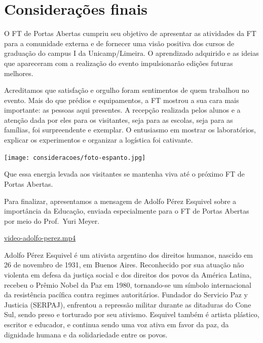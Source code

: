 \documentclass[
  letterpaper,
  DIV=11,
  numbers=noendperiod]{scrreprt}
\begin{document}

\chapter{Considerações finais}\label{considerauxe7uxf5es-finais}

O FT de Portas Abertas cumpriu seu objetivo de apresentar as atividades
da FT para a comunidade externa e de fornecer uma visão positiva dos
cursos de graduação do campus I da Unicamp/Limeira. O aprendizado
adquirido e as ideias que apareceram com a realização do evento
impulsionarão edições futuras melhores.

Acreditamos que satisfação e orgulho foram sentimentos de quem trabalhou
no evento. Mais do que prédios e equipamentos, a FT mostrou a sua cara
mais importante: as pessoas aqui presentes. A recepção realizada pelos
alunos e a atenção dada por eles para os visitantes, seja para as
escolas, seja para as famílias, foi surpreendente e exemplar. O
entusiasmo em mostrar os laboratórios, explicar os experimentos e
organizar a logística foi cativante.

\texttt{[image: consideracoes/foto-espanto.jpg]}

Que essa energia levada aos visitantes se mantenha viva até o próximo FT
de Portas Abertas.

Para finalizar, apresentamos a mensagem de Adolfo Pérez Esquivel sobre a
importância da Educação, enviada especialmente para o FT de Portas
Abertas por meio do Prof.~Yuri Meyer.

\url{video-adolfo-perez.mp4}

\begin{tcolorbox}[enhanced jigsaw, bottomrule=.15mm, left=2mm, colback=white, coltitle=black, colbacktitle=quarto-callout-caution-color!10!white, rightrule=.15mm, colframe=quarto-callout-caution-color-frame, leftrule=.75mm, breakable, arc=.35mm, opacityback=0, titlerule=0mm, bottomtitle=1mm, toptitle=1mm, opacitybacktitle=0.6, title=\textcolor{quarto-callout-caution-color}{\faFire}\hspace{0.5em}{Adolfo Pérez Esquivel}, toprule=.15mm]

Adolfo Pérez Esquivel é um ativista argentino dos direitos humanos,
nascido em 26 de novembro de 1931, em Buenos Aires. Reconhecido por sua
atuação não violenta em defesa da justiça social e dos direitos dos
povos da América Latina, recebeu o Prêmio Nobel da Paz em 1980,
tornando-se um símbolo internacional da resistência pacífica contra
regimes autoritários. Fundador do Servicio Paz y Justicia (SERPAJ),
enfrentou a repressão militar durante as ditaduras do Cone Sul, sendo
preso e torturado por seu ativismo. Esquivel também é artista plástico,
escritor e educador, e continua sendo uma voz ativa em favor da paz, da
dignidade humana e da solidariedade entre os povos.

\end{tcolorbox}
\end{document}
